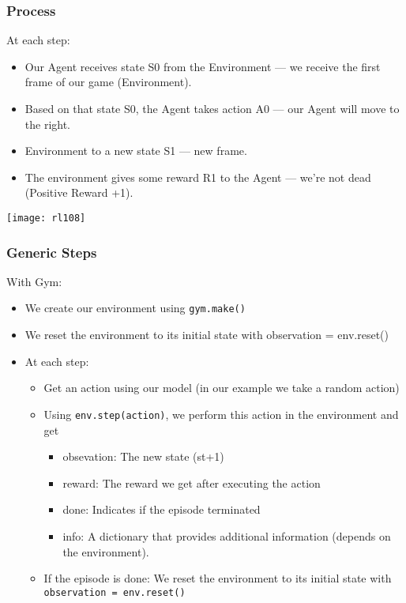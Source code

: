 \begin{frame}[fragile]\frametitle{Process}

At each step:

\begin{itemize}
\item Our Agent receives state S0 from the Environment — we receive the first frame of our game (Environment).
\item Based on that state S0, the Agent takes action A0 — our Agent will move to the right.
\item Environment to a new state S1 — new frame.
\item The environment gives some reward R1 to the Agent — we’re not dead (Positive Reward +1).
\end{itemize}

\begin{center}
\texttt{[image: rl108]}
\end{center}

\end{frame}

\begin{frame}[fragile]\frametitle{Generic Steps}

With Gym:

\begin{itemize}
\item We create our environment using \lstinline|gym.make()|
\item We reset the environment to its initial state with observation = env.reset()
\item At each step:

	\begin{itemize}
	\item Get an action using our model (in our example we take a random action)
	\item Using \lstinline|env.step(action)|, we perform this action in the environment and get

		\begin{itemize}
		\item obsevation: The new state (st+1)
		\item reward: The reward we get after executing the action
		\item done: Indicates if the episode terminated
		\item info: A dictionary that provides additional information (depends on the environment).
		\end{itemize}

	\item If the episode is done: We reset the environment to its initial state with \lstinline|observation = env.reset()|
	\end{itemize}
\end{itemize}

\end{frame}

